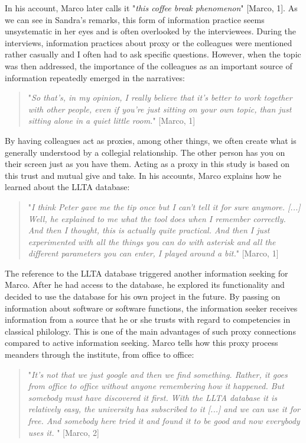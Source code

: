 \documentclass[12pt, a4paper, titlepage, oneside, abstract=true, toc=listof, toc=bibliography, BCOR=1cm]{scrreprt}
\begin{document}
{In his account, Marco later calls it "\textit{this coffee break phenomenon}" [Marco, 1]. As we can see in Sandra's remarks, this form of information practice seems unsystematic in her eyes and is often overlooked by the interviewees. During the interviews, information practices about proxy or the colleagues were mentioned rather casually and I often had to ask specific questions. However, when the topic was then addressed, the importance of the colleagues as an important source of information repeatedly emerged in the narratives: 

\begin{quotation}
"\textit{So that's, in my opinion, I really believe that it's better to work together with other people, even if you're just sitting on your own topic, than just sitting alone in a quiet little room.}" [Marco, 1]
\end{quotation} 

By having colleagues act as proxies, among other things, we often create what is generally understood by a collegial relationship. The other person has you on their screen just as you have them. Acting as a proxy in this study is based on this trust and mutual give and take. In his accounts, Marco explains how he learned about the LLTA database:

\begin{quotation}
"\textit{I think Peter gave me the tip once but I can't tell it for sure anymore. [...] Well, he explained to me what the tool does when I remember correctly. And then I thought, this is actually quite practical. And then I just experimented with all the things you can do with asterisk and all the different parameters you can enter, I played around a bit.}" [Marco, 1]
\end{quotation}

The reference to the LLTA database triggered another information seeking for Marco. After he had access to the database, he explored its functionality and decided to use the database for his own project in the future. By passing on information about software or software functions, the information seeker receives information from a source that he or she trusts with regard to competencies in classical philology. This is one of the main advantages of such proxy connections compared to active information seeking. Marco tells how this proxy process meanders through the institute, from office to office:

\begin{quotation}
"\textit{It's not that we just google and then we find something. Rather, it goes from office to office without anyone remembering how it happened. But somebody must have discovered it first. With the LLTA database it is relatively easy, the university has subscribed to it [...] and we can use it for free. And somebody here tried it and found it to be good and now everybody uses it.} " [Marco, 2]
\end{quotation}

}
\end{document}
